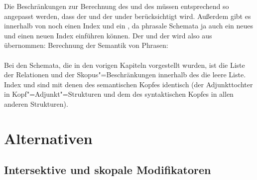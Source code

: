Die Beschränkungen zur Berechnung des \relswes und des \hconswes müssen entsprechend so angepasst
werden, dass der \relsw und der \hconsw under \ccont berücksichtigt wird. Außerdem gibt es innerhalb
von \ccont noch einen Index und ein \ltop, da phrasale Schemata ja auch ein neues \ltop und einen
neuen Index einführen können. Der \indw und der \ltopw wird also aus \ccont übernommen:   
\ea
Berechnung der Semantik von Phrasen:\\
 \impl\\
\z
Bei den Schemata, die in den vorigen  Kapiteln vorgestellt wurden, ist die Liste der Relationen und
der Skopus"=Beschränkungen innerhalb des \ccontwes die leere Liste. Index und \ltop sind mit denen
des semantischen Kopfes identisch (der Adjunkttochter in Kopf"=Adjunkt"=Strukturen und dem des
syntaktischen Kopfes in allen anderen Strukturen).




\section{Alternativen}

\subsection{Intersektive und skopale Modifikatoren}

